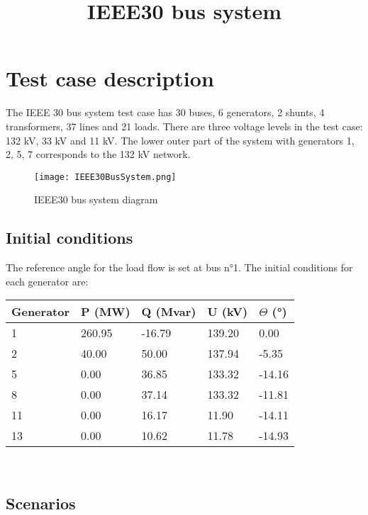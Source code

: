 \documentclass[a4paper, 12pt]{report}
\begin{document}
\title{IEEE30 bus system}

\maketitle

\chapter*{Test case description}

The IEEE 30 bus system test case has 30 buses, 6 generators, 2 shunts, 4 transformers, 37 lines
and 21 loads. There are three voltage levels in the test case: 132 kV, 33 kV and 11 kV. The lower
outer part of the system with generators 1, 2, 5, 7 corresponds to the 132 kV network.

\begin{figure}[H]
  \texttt{[image: IEEE30BusSystem.png]}
  \caption{IEEE30 bus system diagram}
\end{figure}

\section{Initial conditions}

The reference angle for the load flow is set at bus n°1. The initial conditions for each generator
are: \\

\begin{tabular}{ | m{2cm} | m{2cm}| m{2cm} | m{2cm} | m{2cm} | }
  \hline
  \textbf{Generator} & \textbf{P (MW)} & \textbf{Q (Mvar)} & \textbf{U (kV)} & \textbf{$\Theta$ (°)} \\
  \hline
  1 & 260.95 & -16.79 & 139.20 & 0.00 \\
  \hline
  2 & 40.00 & 50.00 & 137.94 & -5.35 \\
  \hline
  5 & 0.00 & 36.85 & 133.32 & -14.16 \\
  \hline
  8 & 0.00 & 37.14 & 133.32 & -11.81 \\
  \hline
  11 & 0.00 & 16.17 & 11.90 & -14.11 \\
  \hline
  13 & 0.00 & 10.62 & 11.78 & -14.93 \\
  \hline
\end{tabular} \\

\section{Scenarios}
\end{document}
